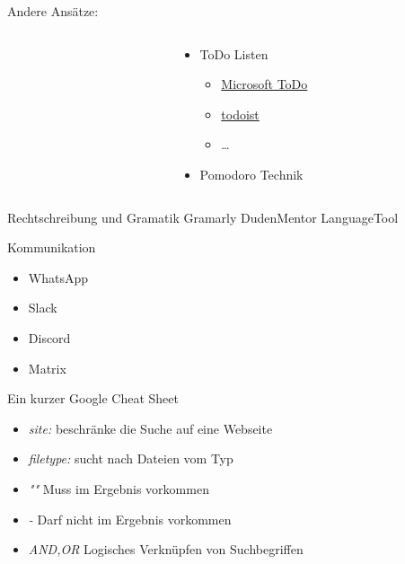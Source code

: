 \documentclass[aspectratio=169,shownotes]{beamer}
\begin{document}
\begin{frame}{Andere Ansätze:}
\begin{columns}[t]
\begin{column}{0.3\textwidth}
        \end{column}
        \begin{column}{0.7\textwidth}
            \begin{itemize}
                \item ToDo Listen
                \begin{itemize}
                    \item \href{https://to-do.office.com/tasks/}{Microsoft ToDo}
                    \item \href{https://todoist.com/de}{todoist}
                    \item \dots
                \end{itemize}
                \item Pomodoro Technik
                 
            \end{itemize}
        \end{column}
    \end{columns}
\end{frame}

\begin{frame}{Rechtschreibung und Gramatik}
    Gramarly
    DudenMentor
    LanguageTool
\end{frame}

\begin{frame}{Kommunikation}
    \begin{itemize}
        \item WhatsApp
        \item Slack
        \item Discord
        \item Matrix        
    \end{itemize}
\end{frame}

\begin{frame}{Ein kurzer Google Cheat Sheet}
    \begin{itemize}
        \item \textit{site:} beschränke die Suche auf eine Webseite
        \item \textit{filetype:} sucht nach Dateien vom Typ
        \item \textit{""}  Muss im Ergebnis vorkommen
        \item \textit{-} Darf nicht im Ergebnis vorkommen
        \item \textit{AND,OR} Logisches Verknüpfen von Suchbegriffen
    \end{itemize}
\end{frame}
\end{document}
